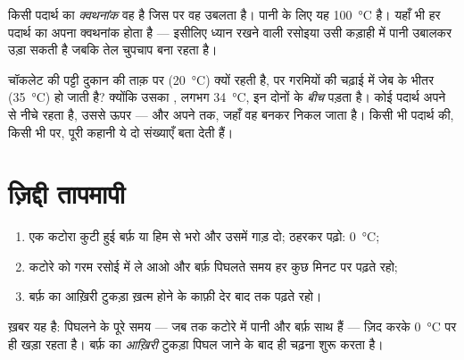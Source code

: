 \begin{definition}[क्वथनांक]\label{def:g4:changes-of-state:boiling-point}
किसी पदार्थ का \emph{क्वथनांक} वह  है जिस पर वह
उबलता है। पानी के लिए यह \qty{100}{\celsius} है। यहाँ भी हर पदार्थ
का अपना क्वथनांक होता है --- इसीलिए ध्यान रखने वाली रसोइया उसी कड़ाही
में पानी उबालकर उड़ा सकती है जबकि तेल चुपचाप  बना रहता है।
\end{definition}

\begin{example}[दो संख्याओं से दुनिया पढ़ना]\label{ex:g4:changes-of-state:reading}
चॉकलेट की पट्टी दुकान की ताक़ पर (\qty{20}{\celsius})  क्यों रहती
है, पर गरमियों की चढ़ाई में जेब के भीतर (\qty{35}{\celsius})  हो
जाती है? क्योंकि उसका , लगभग \qty{34}{\celsius}, इन दोनों के
\emph{बीच} पड़ता है। कोई पदार्थ अपने  से नीचे  रहता है, उससे
ऊपर  --- और अपने  तक, जहाँ वह  बनकर निकल जाता है। किसी
भी पदार्थ की, किसी भी  पर, पूरी कहानी ये दो संख्याएँ बता देती हैं।
\end{example}

\section{ज़िद्दी तापमापी}

\begin{method}[बर्फ़ को ठीक से पिघलते देखना]\label{met:g4:changes-of-state:watch}
\begin{enumerate}
  \item एक कटोरा कुटी हुई बर्फ़ या हिम से भरो और उसमें  गाड़
        दो; ठहरकर पढ़ो: \qty{0}{\celsius};
  \item कटोरे को गरम रसोई में ले आओ और बर्फ़ पिघलते समय हर कुछ मिनट
        पर  पढ़ते रहो;
  \item बर्फ़ का आख़िरी टुकड़ा ख़त्म होने के काफ़ी देर बाद तक पढ़ते
        रहो।
\end{enumerate}
ख़बर यह है: पिघलने के पूरे समय --- जब तक कटोरे में पानी और बर्फ़ साथ
हैं ---  ज़िद करके \qty{0}{\celsius} पर ही खड़ा रहता है। बर्फ़
का \emph{आख़िरी} टुकड़ा पिघल जाने के बाद ही  चढ़ना शुरू करता है।
\end{method}

